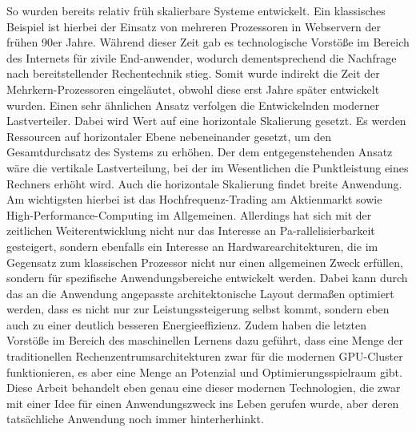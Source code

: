 So wurden bereits relativ früh skalierbare Systeme entwickelt. Ein klassisches Beispiel ist hierbei der Einsatz von mehreren Prozessoren in Webservern der frühen 90er Jahre. Während dieser Zeit gab es technologische Vorstöße im Bereich des Internets für zivile End-anwender, wodurch dementsprechend die Nachfrage nach bereitstellender Rechentechnik stieg. Somit wurde indirekt die Zeit der Mehrkern-Prozessoren eingeläutet, obwohl diese erst Jahre später entwickelt wurden. Einen sehr ähnlichen Ansatz verfolgen die Entwickelnden moderner Lastverteiler. Dabei wird Wert auf eine horizontale Skalierung gesetzt. Es werden Ressourcen auf horizontaler Ebene nebeneinander gesetzt, um den Gesamtdurchsatz des Systems zu erhöhen. Der dem entgegenstehenden Ansatz wäre die vertikale Lastverteilung, bei der im Wesentlichen die Punktleistung eines Rechners erhöht wird. Auch die horizontale Skalierung findet breite Anwendung. Am wichtigsten hierbei ist das Hochfrequenz-Trading am Aktienmarkt sowie High-Performance-Computing im Allgemeinen. \newline \newline Allerdings hat sich mit der zeitlichen Weiterentwicklung nicht nur das Interesse an Pa-rallelisierbarkeit gesteigert, sondern ebenfalls ein Interesse an Hardwarearchitekturen, die im Gegensatz zum klassischen Prozessor nicht nur einen allgemeinen Zweck erfüllen, sondern für spezifische Anwendungsbereiche entwickelt werden. Dabei kann durch das an die Anwendung angepasste architektonische Layout dermaßen optimiert werden, dass es nicht nur zur Leistungssteigerung selbst kommt, sondern eben auch zu einer deutlich besseren Energieeffizienz. Zudem haben die letzten Vorstöße im Bereich des maschinellen Lernens dazu geführt, dass eine Menge der traditionellen Rechenzentrumsarchitekturen zwar für die modernen GPU-Cluster funktionieren, es aber eine Menge an Potenzial und Optimierungsspielraum gibt. \cite{jouppi2017datacenter} \newline \newline Diese Arbeit behandelt eben genau eine dieser modernen Technologien, die zwar mit einer Idee für einen Anwendungszweck ins Leben gerufen wurde, aber deren tatsächliche Anwendung noch immer hinterherhinkt.